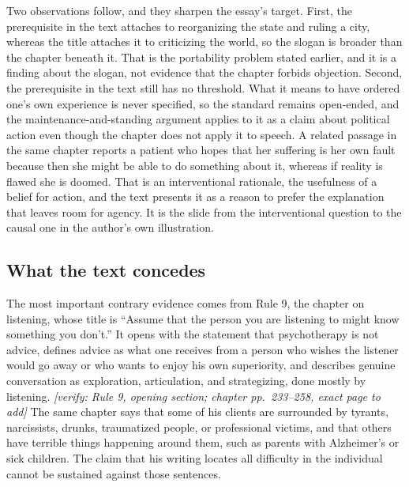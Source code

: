 \documentclass[12pt]{article}
\newif\ifverify\verifytrue
\newcommand{\passage}[1]{\ifverify{\footnotesize\color{gray}\textit{[verify: #1]}}\fi}
\begin{document}
Two observations follow, and they sharpen the essay's target. First, the prerequisite in the text attaches to reorganizing the state and ruling a city, whereas the title attaches it to criticizing the world, so the slogan is broader than the chapter beneath it. That is the portability problem stated earlier, and it is a finding about the slogan, not evidence that the chapter forbids objection. Second, the prerequisite in the text still has no threshold. What it means to have ordered one's own experience is never specified, so the standard remains open-ended, and the maintenance-and-standing argument applies to it as a claim about political action even though the chapter does not apply it to speech. A related passage in the same chapter reports a patient who hopes that her suffering is her own fault because then she might be able to do something about it, whereas if reality is flawed she is doomed. That is an interventional rationale, the usefulness of a belief for action, and the text presents it as a reason to prefer the explanation that leaves room for agency. It is the slide from the interventional question to the causal one in the author's own illustration.

\subsection*{What the text concedes}

The most important contrary evidence comes from Rule 9, the chapter on listening, whose title is ``Assume that the person you are listening to might know something you don't.'' It opens with the statement that psychotherapy is not advice, defines advice as what one receives from a person who wishes the listener would go away or who wants to enjoy his own superiority, and describes genuine conversation as exploration, articulation, and strategizing, done mostly by listening. \passage{Rule 9, opening section; chapter pp.~233--258, exact page to add} The same chapter says that some of his clients are surrounded by tyrants, narcissists, drunks, traumatized people, or professional victims, and that others have terrible things happening around them, such as parents with Alzheimer's or sick children. The claim that his writing locates all difficulty in the individual cannot be sustained against those sentences.
\end{document}
